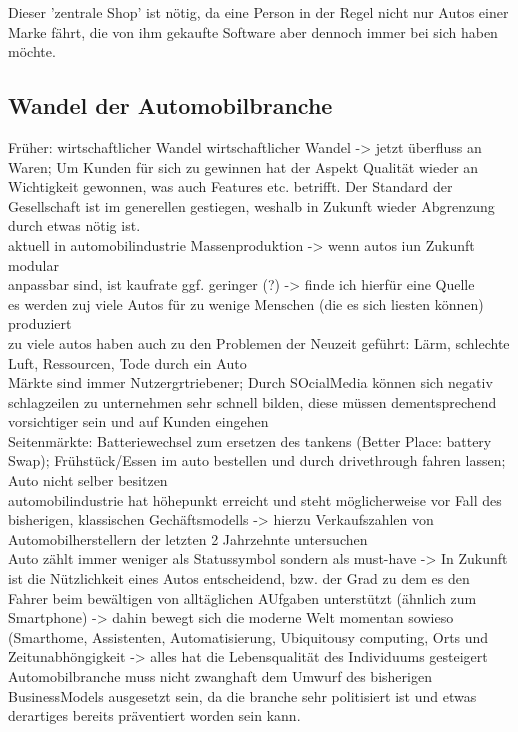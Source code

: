 Dieser 'zentrale Shop' ist nötig, da eine Person in der Regel nicht nur Autos einer Marke fährt, die von ihm gekaufte Software aber dennoch immer bei sich haben möchte.\\
\subsection{Wandel der Automobilbranche}
Früher: wirtschaftlicher Wandel
wirtschaftlicher Wandel -> jetzt überfluss an Waren; Um Kunden für sich zu gewinnen hat der Aspekt Qualität wieder an Wichtigkeit gewonnen, was auch Features etc. betrifft. Der Standard der Gesellschaft ist im generellen gestiegen, weshalb in Zukunft wieder Abgrenzung durch etwas nötig ist.\\
aktuell in automobilindustrie Massenproduktion -> wenn autos iun Zukunft modular\\ anpassbar sind, ist kaufrate ggf. geringer (?) -> finde ich hierfür eine Quelle\\
es werden zuj viele Autos für zu wenige Menschen (die es sich liesten können) produziert\\
zu viele autos haben auch zu den Problemen der Neuzeit geführt: Lärm, schlechte Luft, Ressourcen, Tode durch ein Auto\\
Märkte sind immer Nutzergrtriebener; Durch SOcialMedia können sich negativ schlagzeilen zu unternehmen sehr schnell bilden, diese müssen dementsprechend vorsichtiger sein und auf Kunden eingehen\\
Seitenmärkte: Batteriewechsel zum ersetzen des tankens (Better Place: battery Swap); Frühstück/Essen im auto bestellen und durch drivethrough fahren lassen; Auto nicht selber besitzen\\
automobilindustrie hat höhepunkt erreicht und steht möglicherweise vor Fall des bisherigen, klassischen Gechäftsmodells -> hierzu Verkaufszahlen von Automobilherstellern der letzten 2 Jahrzehnte untersuchen\\
Auto zählt immer weniger als Statussymbol sondern als must-have -> In Zukunft ist die Nützlichkeit eines Autos entscheidend, bzw. der Grad zu dem es den Fahrer beim bewältigen von alltäglichen AUfgaben unterstützt (ähnlich zum Smartphone) -> dahin bewegt sich die moderne Welt momentan sowieso (Smarthome, Assistenten, Automatisierung, Ubiquitousy computing, Orts und Zeitunabhöngigkeit -> alles hat die Lebensqualität des Individuums gesteigert\\
Automobilbranche muss nicht zwanghaft dem Umwurf des bisherigen BusinessModels ausgesetzt sein, da die branche sehr politisiert ist und etwas derartiges bereits präventiert worden sein kann.\\
